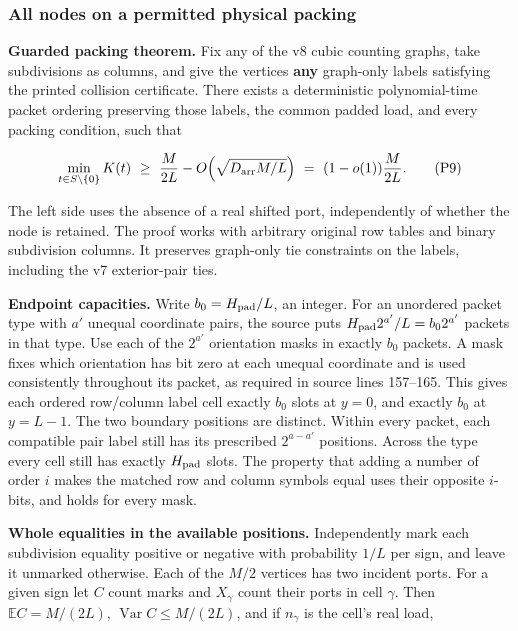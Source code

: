 \documentclass[11pt,a4paper]{article}
\begin{document}
\subsubsection{All nodes on a permitted physical
packing}\label{v9-all-nodes-on-a-permitted-physical-packing}

\textbf{Guarded packing theorem.} Fix any of the v8 cubic counting
graphs, take subdivisions as columns, and give the vertices \textbf{any}
graph-only labels satisfying the printed collision certificate. There
exists a deterministic polynomial-time packet ordering preserving those
labels, the common padded load, and every packing condition, such that

\[
 \min_{t\in S\setminus\{0\}}K(t)
     \ \ge\ \frac{M}{2L}-O\!\left(\sqrt{D_{\rm arr}M/L}\right)
     \ =\ (1-o(1))\frac{M}{2L}.
 \tag{P9}
\]

The left side uses the absence of a real shifted port, independently of
whether the node is retained. The proof works with arbitrary original
row tables and binary subdivision columns. It preserves graph-only tie
constraints on the labels, including the v7 exterior-pair ties.

\textbf{Endpoint capacities.} Write \(b_0=H_{\rm pad}/L\), an integer.
For an unordered packet type with \(a'\) unequal coordinate pairs, the
source puts \(H_{\rm pad}2^{a'}/L=b_0 2^{a'}\) packets in that type. Use
each of the \(2^{a'}\) orientation masks in exactly \(b_0\) packets. A
mask fixes which orientation has bit zero at each unequal coordinate and
is used consistently throughout its packet, as required in source lines
157--165. This gives each ordered row/column label cell exactly \(b_0\)
slots at \(y=0\), and exactly \(b_0\) at \(y=L-1\). The two boundary
positions are distinct. Within every packet, each compatible pair label
still has its prescribed \(2^{a-a'}\) positions. Across the type every
cell still has exactly \(H_{\rm pad}\) slots. The property that adding a
number of order \(i\) makes the matched row and column symbols equal
uses their opposite \(i\)-bits, and holds for every mask.

\textbf{Whole equalities in the available positions.} Independently mark
each subdivision equality positive or negative with probability \(1/L\)
per sign, and leave it unmarked otherwise. Each of the \(M/2\) vertices
has two incident ports. For a given sign let \(C\) count marks and
\(X_\gamma\) count their ports in cell \(\gamma\). Then
\(\mathbb EC=M/(2L)\), \(\operatorname{Var}C\le M/(2L)\), and if
\(n_\gamma\) is the cell's real load,
\end{document}
